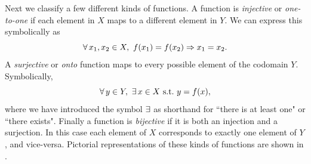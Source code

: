 Next we classify a few different kinds of functions.
A function is {\it injective}
or {\it one-to-one} if each element in $X$
maps to a different element in $Y$. We can express this symbolically as
\begin{equation}
 \operatorname{\forall} x_1,x_2\in X,~f(x_1)=f(x_2)\Rightarrow x_1=x_2.
\end{equation}
A {\it surjective} or {\it onto} function 
maps to every possible element of the codomain $Y$. Symbolically,
\begin{equation}
 \operatorname{\forall} y\in Y,~\operatorname{\exists} x\in X ~\text{s.t.}~ y=f(x), 
\end{equation}
where we have introduced the symbol $\operatorname{\exists}$ as shorthand for ``there is at
least one" or ``there exists". Finally a function is
{\it bijective} if it is both an injection and a surjection. In this case each
element of $X$ corresponds to exactly one element of $Y$, and vice-versa.
Pictorial representations of these kinds of functions are shown in
.

